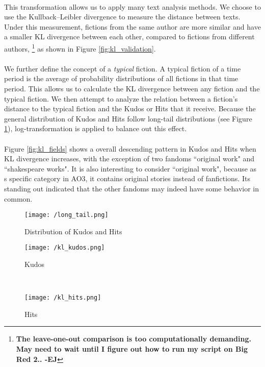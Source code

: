 \documentclass[11pt]{article} %
\def\ej#1{\footnote{\color{blue}\textbf{#1 -EJ}} }
\begin{document}
\paragraph{} This transformation allows us to apply many text analysis methods. We choose to use the Kullback--Leibler divergence to measure the distance between texts. Under this measurement, fictions from the same author are more similar and have a smaller KL divergence between each other, compared to fictions from different authors, \ej{The leave-one-out comparison is too computationally demanding. May need to wait until I figure out how to run my script on Big Red 2..} as shown in Figure \ref{fig:kl_validation}.

\paragraph{} We further define the concept of a \emph{typical} fiction. A typical fiction of a time period is the average of probability distributions of all fictions in that time period. This allows us to calculate the KL divergence between any fiction and the typical fiction. We then attempt to analyze the relation between a fiction's distance to the typical fiction and the Kudos or Hits that it receive. Because the general distribution of Kudos and Hits follow long-tail distributions (see Figure \ref{fig:long_tail}), log-transformation is applied to balance out this effect. 

\paragraph{} Figure \ref{fig:kl_fields} shows a overall descending pattern in Kudos and Hits when KL divergence increases, with the exception of two fandoms ``original work" and ``shakespeare works". It is also interesting to consider ``original work", because as s specific category in AO3, it contains original stories instead of fanfictions. Its standing out indicated that the other fandoms may indeed have some behavior in common. 


\begin{figure}[htbp]
\begin{center}
\texttt{[image: /long\_tail.png]}
\caption{Distribution of Kudos and Hits}
\label{fig:long_tail}
\end{center}
\end{figure}


\begin{figure*}[t!]
    \centering
    \begin{subfigure}[t]{0.7\textwidth}
        \centering
        \texttt{[image: /kl\_kudos.png]}
        \caption{Kudos}
    \end{subfigure}%
    ~ 
    \begin{subfigure}[t]{0.3\textwidth}
        \centering
        \texttt{[image: /kl\_hits.png]}
        \caption{Hits}
    \end{subfigure}
    \caption{Relation between fictions' KL divergence to standard work and their Kudos or Hits in 8 fandoms. The KL divergence is turned into z-score; both Kudos and Hits are log-transformed. }
    \label{fig:kl_fields}
\end{figure*}
\end{document}

